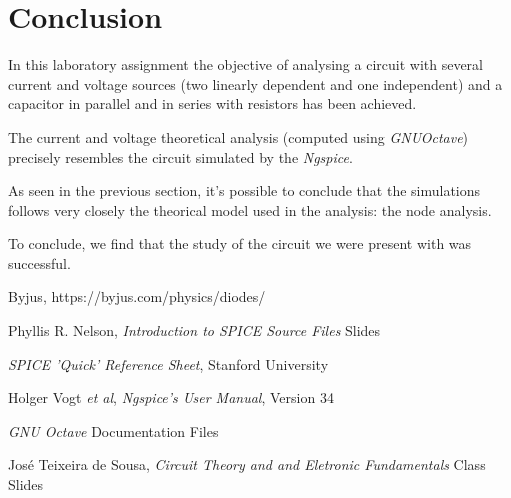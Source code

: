 \clearpage
\section{Conclusion}
\label{sec:conclusion}



In this laboratory assignment the objective of analysing a circuit with several current and voltage sources (two linearly
dependent and one independent) and a capacitor in parallel and in series with resistors has been
achieved.

The current and voltage theoretical analysis (computed using \textit{GNUOctave}) precisely resembles the
circuit simulated by the \textit{Ngspice}. 

As seen in the previous section, it's possible to conclude that the simulations follows very closely the theorical model
used in the analysis: the node analysis.

To conclude, we find that the study of the circuit we were present with was successful.

\begin{thebibliography}{}

Byjus, https://byjus.com/physics/diodes/

Phyllis R. Nelson, \emph{Introduction to SPICE Source Files} Slides

\emph{SPICE 'Quick' Reference Sheet}, Stanford University

Holger Vogt \textit{et al}, \emph{Ngspice's User Manual}, Version 34

\emph{GNU Octave} Documentation Files 

José Teixeira de Sousa, \emph{Circuit Theory and and Eletronic Fundamentals} Class Slides

\end{thebibliography}